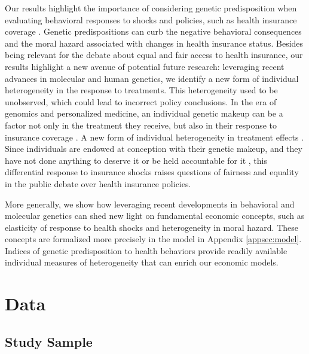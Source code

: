 \documentclass[11pt]{article}
\begin{document}
Our results highlight the importance of considering genetic predisposition when evaluating behavioral responses to shocks and policies, such as health insurance coverage \citep{Brock1993,Morrison2005}.
Genetic predispositions can curb the negative behavioral consequences and the moral hazard associated with changes in health insurance status.
Besides being relevant for the debate about equal and fair access to health insurance, our results highlight a new avenue of potential future research:
leveraging recent advances in molecular and human genetics, we identify a new form of individual heterogeneity in the response to treatments. This heterogeneity used to be unobserved, which could lead to incorrect policy conclusions.
In the era of genomics and personalized medicine, an individual genetic makeup can be a factor not only in the treatment they receive, but also in their response to insurance coverage \citep{Khera2018,Torkamani2018,Schork2018,Ritz2017}.
A new form of individual heterogeneity in treatment effects \citep{Papageorge2020}.
Since individuals are endowed at conception with their genetic makeup, and they have not done anything to deserve it or be held accountable for it \citep{Barth2019,Kweon2020,Pereira2021,Harden2021}, this differential response to insurance shocks raises questions of fairness and equality in the public debate over health insurance policies.

More generally, we show how leveraging recent developments in behavioral and molecular genetics can shed new light on fundamental economic concepts, such as elasticity of response to health shocks and heterogeneity in moral hazard.
These concepts are formalized more precisely in the model in Appendix \ref{appsec:model}.
Indices of genetic predisposition to health behaviors provide readily available individual measures of heterogeneity that can enrich our economic models.

\section{Data} \label{sec:data}

\subsection{Study Sample}\label{sec:sample}
\end{document}
